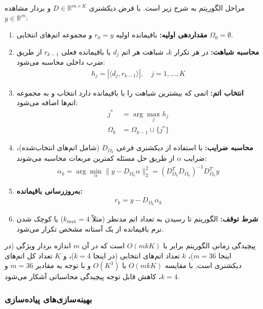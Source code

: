 مراحل الگوریتم  به شرح زیر است. با فرض دیکشنری $D \in \mathbb{R}^{m \times K}$ و بردار مشاهده $y \in \mathbb{R}^m$:

\begin{enumerate}
\item \textbf{مقداردهی اولیه:}
باقیمانده اولیه $r_0 = y$ و مجموعه اتم‌های انتخابی $\Omega_0 = \emptyset$.

\item \textbf{محاسبه شباهت:}
در هر تکرار $k$، شباهت هر اتم $d_j$ با باقیمانده فعلی $r_{k-1}$ از طریق ضرب داخلی محاسبه می‌شود:
\begin{align}
h_j = |\langle d_j, r_{k-1} \rangle|, \quad j = 1, \ldots, K
\end{align}

\item \textbf{انتخاب اتم:}
اتمی که بیشترین شباهت را با باقیمانده دارد انتخاب و به مجموعه اتم‌ها اضافه می‌شود:
\begin{align}
j^* &= \arg\max_j h_j \\
\Omega_k &= \Omega_{k-1} \cup \{j^*\}
\end{align}

\item \textbf{محاسبه ضرایب:}
با استفاده از دیکشنری فرعی $D_{\Omega_k}$ (شامل اتم‌های انتخاب‌شده)، ضرایب $\alpha$ از طریق حل مسئله کمترین مربعات محاسبه می‌شوند:
\begin{align}
\alpha_k = \arg\min_{\alpha} \|y - D_{\Omega_k} \alpha\|_2^2 = (D_{\Omega_k}^T D_{\Omega_k})^{-1} D_{\Omega_k}^T y
\end{align}

\item \textbf{به‌روزرسانی باقیمانده:}
\begin{align}
r_k = y - D_{\Omega_k} \alpha_k
\end{align}

\item \textbf{شرط توقف:}
الگوریتم تا رسیدن به تعداد اتم مدنظر (مثلاً $k_{\max} = 4$) یا کوچک شدن نرم باقیمانده از یک آستانه مشخص تکرار می‌شود.
\end{enumerate}

پیچیدگی زمانی الگوریتم  برابر با $O(mkK)$ است که در آن $m$ اندازه بردار ویژگی (در اینجا $m = 36$)، $k$ تعداد اتم‌های انتخابی (در اینجا $k = 4$)، و $K$ تعداد کل اتم‌های دیکشنری است. با مقایسه $O(mkK)$ با $O(K^3)$ و با توجه به مقادیر $m = 36$ و $k = 4$، کاهش قابل توجه پیچیدگی محاسباتی آشکار می‌شود.

\subsubsection{بهینه‌سازی‌های پیاده‌سازی}

